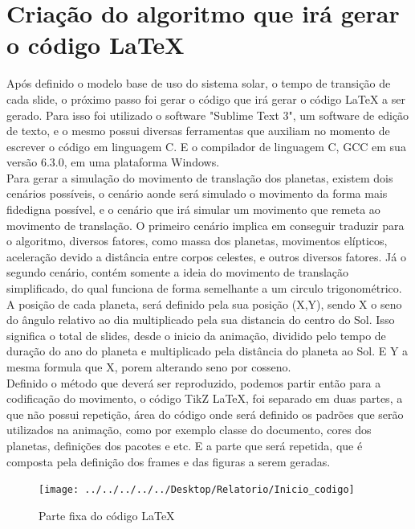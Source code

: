 \documentclass[
	12pt,				%
	openright,			%
	oneside,
	a4paper,			%
	english,			%
	french,				%
	spanish,			%
	brazil,				%
	]{abntex2}
\begin{document}
\section{Criação do algoritmo que irá gerar o código LaTeX}
	Após definido o modelo base de uso do sistema solar, o tempo de transição de cada slide, o próximo passo foi gerar o código que irá gerar o código LaTeX a ser gerado. Para isso foi utilizado o software "Sublime Text 3", um software de edição de texto, e o mesmo possui diversas ferramentas que auxiliam no momento de escrever o código em linguagem C. E o compilador de linguagem C, GCC em sua versão 6.3.0, em uma plataforma Windows.
	\\ \indent Para gerar a simulação do movimento de translação dos planetas, existem dois cenários possíveis, o cenário aonde será simulado o movimento da forma mais fidedigna possível, e o cenário que irá simular um movimento que remeta ao movimento de translação. O primeiro cenário implica em conseguir traduzir para o algoritmo, diversos fatores, como massa dos planetas, movimentos elípticos, aceleração devido a distância entre corpos celestes, e outros diversos fatores.
	Já o segundo cenário, contém somente a ideia do movimento de translação simplificado, do qual funciona de forma semelhante a um circulo trigonométrico.
	\\ \indent A posição de cada planeta, será definido pela sua posição (X,Y), sendo X o seno do ângulo relativo ao dia multiplicado pela sua distancia do centro do Sol. Isso significa o total de slides, desde o inicio da animação, dividido pelo tempo de duração do ano do planeta e multiplicado pela distância do planeta ao Sol. E Y a mesma formula que X, porem alterando seno por cosseno.
	\\ \indent Definido o método que deverá ser reproduzido, podemos partir então para a codificação do movimento, o código TikZ LaTeX, foi separado em duas partes, a que não possui repetição, área do código onde será definido os padrões que serão utilizados na animação, como por exemplo classe do documento, cores dos planetas, definições dos pacotes e etc. E a parte que será repetida, que é composta pela definição dos frames e das figuras a serem geradas.\\
	\begin{figure}[h]
		\centering
		\texttt{[image: ../../../../../Desktop/Relatorio/Inicio\_codigo]}
		\caption{Parte fixa do código LaTeX}
		\label{fig:Inicio_codigo}
	\end{figure}
\end{document}
